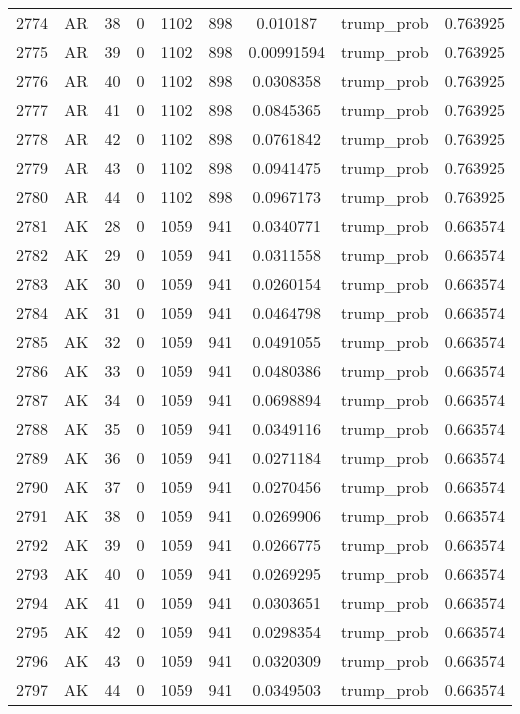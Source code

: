 \documentclass[12pt,a4paper]{article}
\begin{document}
\begin{tabular}{r|cccccccc}
	2774 & AR & 38 & 0 & 1102 & 898 & 0.010187 & trump\_prob & 0.763925 \\
	2775 & AR & 39 & 0 & 1102 & 898 & 0.00991594 & trump\_prob & 0.763925 \\
	2776 & AR & 40 & 0 & 1102 & 898 & 0.0308358 & trump\_prob & 0.763925 \\
	2777 & AR & 41 & 0 & 1102 & 898 & 0.0845365 & trump\_prob & 0.763925 \\
	2778 & AR & 42 & 0 & 1102 & 898 & 0.0761842 & trump\_prob & 0.763925 \\
	2779 & AR & 43 & 0 & 1102 & 898 & 0.0941475 & trump\_prob & 0.763925 \\
	2780 & AR & 44 & 0 & 1102 & 898 & 0.0967173 & trump\_prob & 0.763925 \\
	2781 & AK & 28 & 0 & 1059 & 941 & 0.0340771 & trump\_prob & 0.663574 \\
	2782 & AK & 29 & 0 & 1059 & 941 & 0.0311558 & trump\_prob & 0.663574 \\
	2783 & AK & 30 & 0 & 1059 & 941 & 0.0260154 & trump\_prob & 0.663574 \\
	2784 & AK & 31 & 0 & 1059 & 941 & 0.0464798 & trump\_prob & 0.663574 \\
	2785 & AK & 32 & 0 & 1059 & 941 & 0.0491055 & trump\_prob & 0.663574 \\
	2786 & AK & 33 & 0 & 1059 & 941 & 0.0480386 & trump\_prob & 0.663574 \\
	2787 & AK & 34 & 0 & 1059 & 941 & 0.0698894 & trump\_prob & 0.663574 \\
	2788 & AK & 35 & 0 & 1059 & 941 & 0.0349116 & trump\_prob & 0.663574 \\
	2789 & AK & 36 & 0 & 1059 & 941 & 0.0271184 & trump\_prob & 0.663574 \\
	2790 & AK & 37 & 0 & 1059 & 941 & 0.0270456 & trump\_prob & 0.663574 \\
	2791 & AK & 38 & 0 & 1059 & 941 & 0.0269906 & trump\_prob & 0.663574 \\
	2792 & AK & 39 & 0 & 1059 & 941 & 0.0266775 & trump\_prob & 0.663574 \\
	2793 & AK & 40 & 0 & 1059 & 941 & 0.0269295 & trump\_prob & 0.663574 \\
	2794 & AK & 41 & 0 & 1059 & 941 & 0.0303651 & trump\_prob & 0.663574 \\
	2795 & AK & 42 & 0 & 1059 & 941 & 0.0298354 & trump\_prob & 0.663574 \\
	2796 & AK & 43 & 0 & 1059 & 941 & 0.0320309 & trump\_prob & 0.663574 \\
	2797 & AK & 44 & 0 & 1059 & 941 & 0.0349503 & trump\_prob & 0.663574 \\

\end{tabular}
\end{document}
